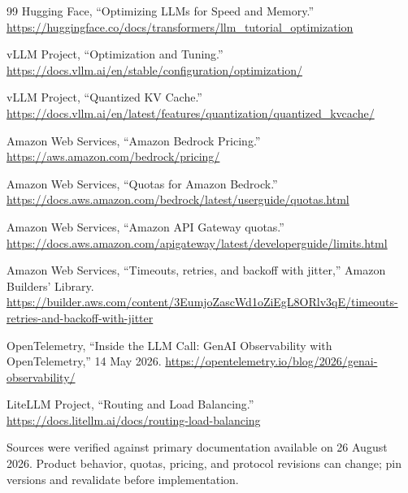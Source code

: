 \documentclass[10pt]{article}
\begin{document}
\begin{thebibliography}{99}
Hugging Face, ``Optimizing LLMs for Speed and Memory.''\newline
\url{https://huggingface.co/docs/transformers/llm_tutorial_optimization}

vLLM Project, ``Optimization and Tuning.''\newline
\url{https://docs.vllm.ai/en/stable/configuration/optimization/}

vLLM Project, ``Quantized KV Cache.''\newline
\url{https://docs.vllm.ai/en/latest/features/quantization/quantized_kvcache/}

Amazon Web Services, ``Amazon Bedrock Pricing.''\newline
\url{https://aws.amazon.com/bedrock/pricing/}

Amazon Web Services, ``Quotas for Amazon Bedrock.''\newline
\url{https://docs.aws.amazon.com/bedrock/latest/userguide/quotas.html}

Amazon Web Services, ``Amazon API Gateway quotas.''\newline
\url{https://docs.aws.amazon.com/apigateway/latest/developerguide/limits.html}

Amazon Web Services, ``Timeouts, retries, and backoff with jitter,'' Amazon Builders' Library.\newline
\url{https://builder.aws.com/content/3EumjoZascWd1oZiEgL8ORlv3qE/timeouts-retries-and-backoff-with-jitter}

OpenTelemetry, ``Inside the LLM Call: GenAI Observability with OpenTelemetry,'' 14 May 2026.\newline
\url{https://opentelemetry.io/blog/2026/genai-observability/}

LiteLLM Project, ``Routing and Load Balancing.''\newline
\url{https://docs.litellm.ai/docs/routing-load-balancing}

\end{thebibliography}

\vfill
\begin{center}
\small\sffamily\color{muted}
Sources were verified against primary documentation available on 26 August 2026. Product behavior, quotas, pricing, and protocol revisions can change; pin versions and revalidate before implementation.
\end{center}
\end{document}

